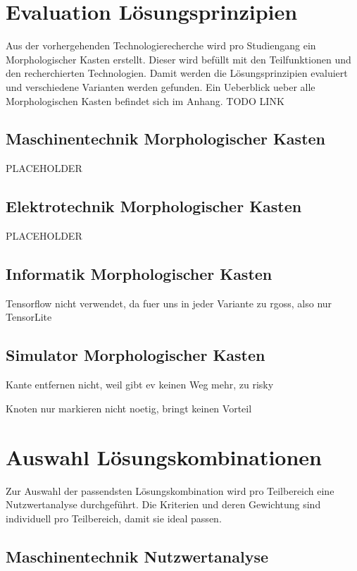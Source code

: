 \section{Evaluation Lösungsprinzipien}

Aus der vorhergehenden Technologierecherche wird pro Studiengang ein Morphologischer Kasten erstellt. Dieser wird befüllt mit den Teilfunktionen und den recherchierten Technologien. Damit werden die Lösungsprinzipien evaluiert und verschiedene Varianten werden gefunden. Ein Ueberblick ueber alle Morphologischen Kasten befindet sich im Anhang. TODO LINK

\subsection{Maschinentechnik Morphologischer Kasten}

PLACEHOLDER

\subsection{Elektrotechnik Morphologischer Kasten}

PLACEHOLDER

\subsection{Informatik Morphologischer Kasten}

Tensorflow nicht verwendet, da fuer uns in jeder Variante zu rgoss, also nur TensorLite

\subsection{Simulator Morphologischer Kasten}

Kante entfernen nicht, weil gibt ev keinen Weg mehr, zu risky

Knoten nur markieren nicht noetig, bringt keinen Vorteil


\newpage
\section{Auswahl Lösungskombinationen}

Zur Auswahl der passendsten Lösungskombination wird pro Teilbereich eine Nutzwertanalyse durchgeführt. Die Kriterien und deren Gewichtung sind individuell pro Teilbereich, damit sie ideal passen.

\subsection{Maschinentechnik Nutzwertanalyse}

